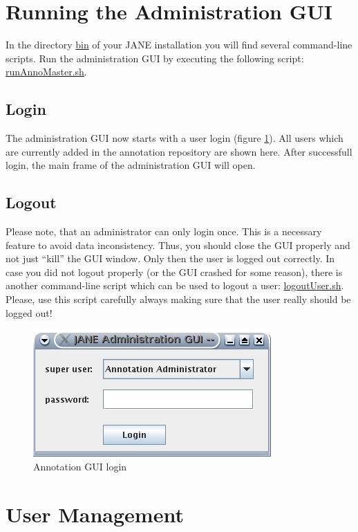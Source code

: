 \documentclass[DIV12,english,11pt,halfparskip]{scrartcl}
\begin{document}
\section{Running the Administration GUI}
In the directory \url{bin} of your \textsc{JANE} installation you will
find several command-line scripts. Run the administration GUI by
executing the following script: \url{runAnnoMaster.sh}.

\subsection{Login}
The administration GUI now starts with a user login (figure
\ref{fig:login}). All users which are currently added in the
annotation repository are shown here. After successfull login, the
main frame of the administration GUI will open.

\subsection{Logout}
Please note, that an administrator can only login once. This is a
necessary feature to avoid data inconsistency. Thus, you should close
the GUI properly and not just ``kill'' the GUI window. Only then the
user is logged out correctly. In case you did not logout properly (or
the GUI crashed for some reason), there is another command-line script
which can be used to logout a user: \url{logoutUser.sh}. Please, use
this script carefully always making sure that the user really should
be logged out!


\begin{figure}[h]
  \centering
  \includegraphics[scale=0.7]{figs/AnnoMasterLogin.jpg}
  \caption{Annotation GUI login}
  \label{fig:login}
\end{figure}



\section{User Management}
\end{document}
